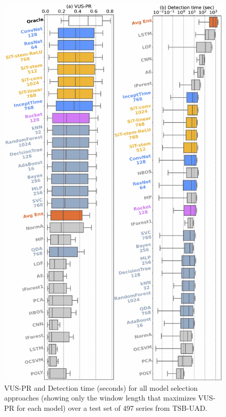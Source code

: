 \begin{figure}
    \centering
    \includegraphics[width=1\linewidth]{figures/Fig5.jpg}
        \caption{VUS-PR and Detection time (seconds) for all model selection approaches (showing only the window length that maximizes VUS-PR for each model) over a test set of 497 series from TSB-UAD. }
        \label{fig:overall_res}
\end{figure}


